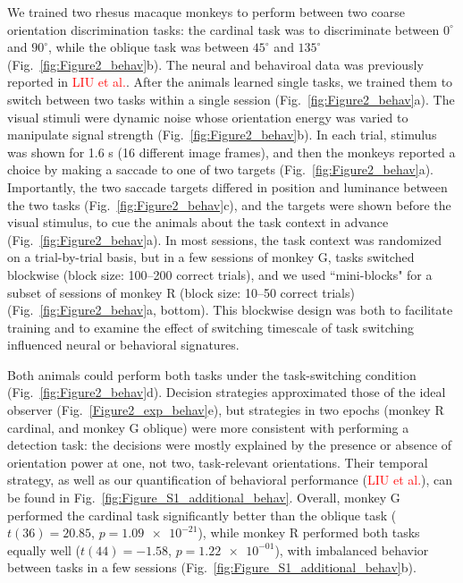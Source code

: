 \documentclass[lineno,pdflatex,sn-basic]{sn-jnl}%
\theoremstyle{thmstyleone}%
\theoremstyle{thmstyletwo}%
\theoremstyle{thmstylethree}%
\begin{document}
We trained two rhesus macaque monkeys to perform between two coarse orientation discrimination tasks: the cardinal task was to discriminate between $0^\circ$ and $90^\circ$, while the oblique task was between $ 45^\circ$ and $135^\circ$ (Fig.~\ref{fig:Figure2_behav}b). The neural and behaviroal data was previously reported in \textcolor{red}{LIU et al.}. After the animals learned single tasks, we trained them to switch between two tasks within a single session (Fig.~\ref{fig:Figure2_behav}a). The visual stimuli were dynamic noise whose orientation energy was varied to manipulate signal strength \cite{nienborg2014decision, bondy2018feedback,lange2023weak} (Fig.~\ref{fig:Figure2_behav}b). In each trial, stimulus was shown for 1.6 s (16 different image frames), and then the monkeys reported a choice by making a saccade to one of two targets (Fig.~\ref{fig:Figure2_behav}a). Importantly, the two saccade targets differed in position and luminance between the two tasks (Fig.~\ref{fig:Figure2_behav}c), and the targets were shown before the visual stimulus, to cue the animals about the task context in advance (Fig.~\ref{fig:Figure2_behav}a). In most sessions, the task context was randomized on a trial-by-trial basis, but in a few sessions of monkey G, tasks switched blockwise (block size: 100--200 correct trials), and we used ``mini-blocks" for a subset of sessions of monkey R (block size: 10--50 correct trials) (Fig.~\ref{fig:Figure2_behav}a, bottom). This blockwise design was both to facilitate training and to examine the effect of switching timescale of task switching influenced neural or behavioral signatures.

Both animals could perform both tasks under the task-switching condition (Fig.~\ref{fig:Figure2_behav}d). Decision strategies approximated those of the ideal observer (Fig.~\ref{Figure2_exp_behav}e), but strategies in two epochs (monkey R cardinal, and monkey G oblique) were more consistent with performing a detection task: the decisions were mostly explained by the presence or absence of orientation power at one, not two, task-relevant orientations. Their temporal strategy, as well as our quantification of behavioral performance (\textcolor{red}{LIU et al.}), can be found in Fig.~\ref{fig:Figure_S1_additional_behav}. Overall, monkey G performed the cardinal task significantly better than the oblique task ($t(36) = 20.85$, $p = \num{1.09e-21}$), while monkey R performed both tasks equally well ($t(44) = -1.58$, $p = \num{1.22e-01}$), with imbalanced behavior between tasks in a few sessions (Fig.~\ref{fig:Figure_S1_additional_behav}b). 
 
\end{document}

